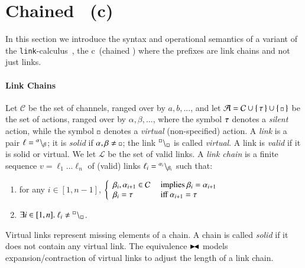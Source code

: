 
\section{Chained \CNA \ (c\CNA)}
\label{sec:ccna}

In this section we introduce  the syntax and operational semantics
of a variant of the {\tt link}-calculus~\cite{BodeiBB12}, the c\CNA\  (chained \CNA)
where the prefixes are link chains and not just links.

\paragraph{Link Chains}
Let $\mathcal{C}$ be the set of channels, ranged over by $a,b,...$, and 
let $\mathcal{A} = \mathcal{C} \cup \{\, \tau \,\} \cup \{\, {\scriptstyle \square} \,\}$ be the set of actions, ranged over by $\alpha,\beta,...$,
where the symbol $\tau$ denotes a \emph{silent} action, while the symbol $\scriptstyle {\square}$ denotes a \emph{virtual} (non-specified) action.
A \emph{link} is a pair $\ell={}^{\alpha} \backslash_{\beta}$;
it is \emph{solid} if $\alpha,\beta \neq \ \noacts$; 
the link ${}^{\scriptstyle {\square}} \backslash_{\scriptstyle {\square}}$ is called \emph{virtual}.
A link is \emph{valid} if it is solid or virtual.
We let $\mathcal{L}$ be the set of valid links.
%
A \emph{link chain} is a 
finite sequence $v = \ell_{1}...\ell_{n}$ of (valid) links  $\ell_{i} = {}^{\alpha_{i}} \backslash_{\beta_{i}}$ such that:
\begin{enumerate}
\item for any $i\in [1,n-1]$, 
$\left\{\begin{array}{ll}
\beta_{i},\alpha_{i+1}\in \mathcal{C} & \mbox{ implies } \beta_{i} = \alpha_{i+1}\\
\beta_{i}=\tau & \mbox{ iff } \alpha_{i+1}=\tau
\end{array}\right.
$
\item  $\exists i \in [1,n]. \ \ell_i \neq {}^{\scriptstyle {\square}} \backslash_{\scriptstyle {\square}}$.
\end{enumerate}

Virtual links represent missing elements of a chain. 
A chain is called \emph{solid} if it does not contain any virtual link.
The equivalence $\blackstretcheq$ models expansion/contraction of virtual links to adjust the length of a link chain.


